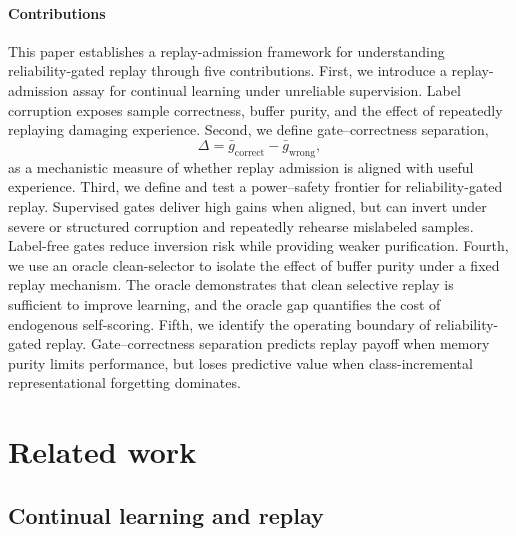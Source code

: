 \documentclass[preprint,12pt]{elsarticle}
\begin{document}
\paragraph{Contributions}
This paper establishes a replay-admission framework for understanding reliability-gated replay through five contributions. First, we introduce a replay-admission assay for continual learning under unreliable supervision. Label corruption exposes sample correctness, buffer purity, and the effect of repeatedly replaying damaging experience. Second, we define gate--correctness separation,
\[
\Delta = \bar{g}_{\mathrm{correct}} - \bar{g}_{\mathrm{wrong}},
\]
as a mechanistic measure of whether replay admission is aligned with useful experience. Third, we define and test a power--safety frontier for reliability-gated replay. Supervised gates deliver high gains when aligned, but can invert under severe or structured corruption and repeatedly rehearse mislabeled samples. Label-free gates reduce inversion risk while providing weaker purification. Fourth, we use an oracle clean-selector to isolate the effect of buffer purity under a fixed replay mechanism. The oracle demonstrates that clean selective replay is sufficient to improve learning, and the oracle gap quantifies the cost of endogenous self-scoring. Fifth, we identify the operating boundary of reliability-gated replay. Gate--correctness separation predicts replay payoff when memory purity limits performance, but loses predictive value when class-incremental representational forgetting dominates.

\section{Related work}

\subsection{Continual learning and replay}
\end{document}
